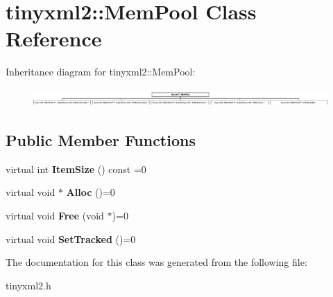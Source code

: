 \hypertarget{classtinyxml2_1_1_mem_pool}{}\section{tinyxml2\+:\+:Mem\+Pool Class Reference}
\label{classtinyxml2_1_1_mem_pool}
Inheritance diagram for tinyxml2\+:\+:Mem\+Pool\+:\begin{figure}[H]
\begin{center}
\leavevmode
\includegraphics[height=0.691358cm]{classtinyxml2_1_1_mem_pool}
\end{center}
\end{figure}
\subsection*{Public Member Functions}
\begin{DoxyCompactItemize}
\item 
\mbox{\label{classtinyxml2_1_1_mem_pool_a0c518d49e3a94bde566f61e13b7240bb}} 
virtual int {\bfseries Item\+Size} () const =0
\item 
\mbox{\label{classtinyxml2_1_1_mem_pool_a4f977b5fed752c0bbfe5295f469d6449}} 
virtual void $\ast$ {\bfseries Alloc} ()=0
\item 
\mbox{\label{classtinyxml2_1_1_mem_pool_a49e3bfac2cba2ebd6776b31e571f64f7}} 
virtual void {\bfseries Free} (void $\ast$)=0
\item 
\mbox{\label{classtinyxml2_1_1_mem_pool_ac5804dd1387b2e4de5eef710076a0db1}} 
virtual void {\bfseries Set\+Tracked} ()=0
\end{DoxyCompactItemize}


The documentation for this class was generated from the following file\+:\begin{DoxyCompactItemize}
\item 
tinyxml2.\+h\end{DoxyCompactItemize}
